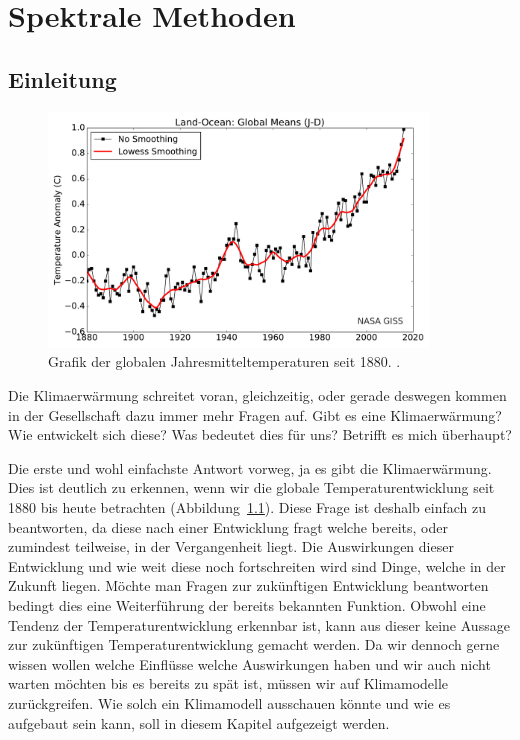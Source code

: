 \chapter{Spektrale Methoden\label{chapter:klima}}
\begin{refsection}

\section{Einleitung
\label{klima:section:einleitung}}

\begin{figure}
\centering
\includegraphics[width=0.9\textwidth]{klima/nasa_giss.pdf}
\caption{Grafik der globalen Jahresmitteltemperaturen seit 1880. \cite{klima:nasa}.
\label{klima:einleitung:nasa}}
\end{figure}

Die Klimaerwärmung schreitet voran, gleichzeitig, oder gerade deswegen kommen in der Gesellschaft dazu immer mehr Fragen auf. Gibt es eine Klimaerwärmung? Wie entwickelt sich diese? Was bedeutet dies für uns? Betrifft es mich überhaupt?

Die erste und wohl einfachste Antwort vorweg, ja es gibt die Klimaerwärmung. Dies ist deutlich zu erkennen, wenn wir die globale Temperaturentwicklung seit 1880 bis heute betrachten (Abbildung~\ref{klima:einleitung:nasa}). Diese Frage ist deshalb einfach zu beantworten, da diese nach einer Entwicklung fragt welche bereits, oder zumindest teilweise, in der Vergangenheit liegt. Die Auswirkungen dieser Entwicklung und wie weit diese noch fortschreiten wird sind Dinge, welche in der Zukunft liegen. Möchte man Fragen zur zukünftigen Entwicklung beantworten bedingt dies eine Weiterführung der bereits bekannten Funktion. Obwohl eine Tendenz der Temperaturentwicklung erkennbar ist, kann aus dieser keine Aussage zur zukünftigen Temperaturentwicklung gemacht werden. Da wir dennoch gerne wissen wollen welche Einflüsse welche Auswirkungen haben und wir auch nicht warten möchten bis es bereits zu spät ist, müssen wir auf Klimamodelle zurückgreifen. Wie solch ein Klimamodell ausschauen könnte und wie es aufgebaut sein kann, soll in diesem Kapitel aufgezeigt werden.


\end{refsection}

